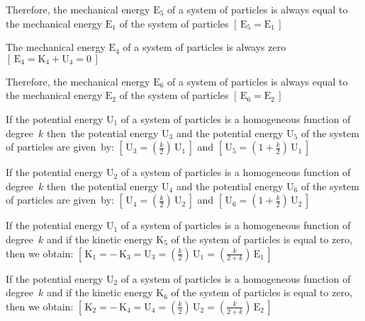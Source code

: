 \documentclass[10pt]{article}
\begin{document}
\par \bigskip\smallskip \noindent Therefore, the mechanical energy ${\mathrm{E}}_5$ of a system of particles is always equal to the mechanical energy ${\mathrm{E}}_1$ of the system of particles $[ \, {\mathrm{E}}_5 = {\mathrm{E}}_1 \, ]$

\par \bigskip\smallskip \noindent The mechanical energy ${\mathrm{E}}_4$ of a system of particles is always zero $[ \, {\mathrm{E}}_4 = {\mathrm{K}}_4 + {\mathrm{U}}_4 = 0 \, ]$

\par \bigskip\smallskip \noindent Therefore, the mechanical energy ${\mathrm{E}}_6$ of a system of particles is always equal to the mechanical energy ${\mathrm{E}}_2$ of the system of particles $[ \, {\mathrm{E}}_6 = {\mathrm{E}}_2 \, ]$

\par \bigskip\smallskip \noindent If the potential energy ${\mathrm{U}}_1$ of a system of particles is a homogeneous function of \hbox {degree ${\mathit{k}}$} \hbox {then the} potential energy ${\mathrm{U}}_3$ and the potential energy ${\mathrm{U}}_5$ of the system of particles are \hbox {given by}: $[ \, {\mathrm{U}}_3 = (\frac{{\mathit{k}}}{2}) \, {\mathrm{U}}_1 \, ]$ and $[ \, {\mathrm{U}}_5 = ({\scriptstyle 1 +} \frac{{\mathit{k}}}{2}) \, {\mathrm{U}}_1 \, ]$

\par \bigskip\smallskip \noindent If the potential energy ${\mathrm{U}}_2$ of a system of particles is a homogeneous function of \hbox {degree ${\mathit{k}}$} \hbox {then the} potential energy ${\mathrm{U}}_4$ and the potential energy ${\mathrm{U}}_6$ of the system of particles are \hbox {given by}: $[ \, {\mathrm{U}}_4 = (\frac{{\mathit{k}}}{2}) \, {\mathrm{U}}_2 \, ]$ and $[ \, {\mathrm{U}}_6 = ({\scriptstyle 1 +} \frac{{\mathit{k}}}{2}) \, {\mathrm{U}}_2 \, ]$

\par \bigskip\smallskip \noindent If the potential energy ${\mathrm{U}}_1$ of a system of particles is a homogeneous function of \hbox {degree ${\mathit{k}}$} and if the kinetic energy ${\mathrm{K}}_5$ of the system of particles is equal to zero, then we obtain: $[ \, {\mathrm{K}}_1 = - \, {\mathrm{K}}_3 = {\mathrm{U}}_3 = (\frac{{\mathit{k}}}{2}) \, {\mathrm{U}}_1 = (\frac{{\mathit{k}}}{2 + {\mathit{k}}}) \, {\mathrm{E}}_1 \, ]$

\par \bigskip\smallskip \noindent If the potential energy ${\mathrm{U}}_2$ of a system of particles is a homogeneous function of \hbox {degree ${\mathit{k}}$} and if the kinetic energy ${\mathrm{K}}_6$ of the system of particles is equal to zero, then we obtain: $[ \, {\mathrm{K}}_2 = - \, {\mathrm{K}}_4 = {\mathrm{U}}_4 = (\frac{{\mathit{k}}}{2}) \, {\mathrm{U}}_2 = (\frac{{\mathit{k}}}{2 + {\mathit{k}}}) \, {\mathrm{E}}_2 \, ]$
\end{document}
